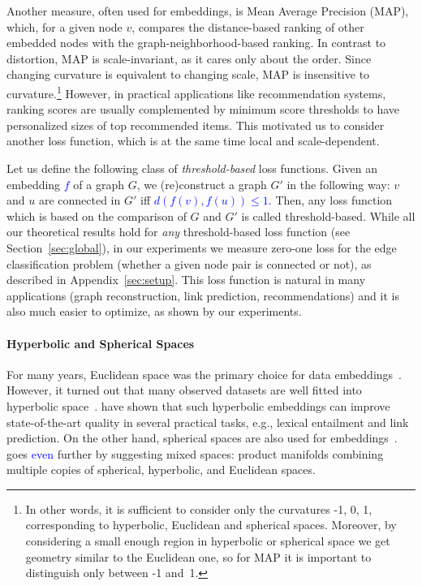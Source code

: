\documentclass{article} %
\newcommand{\ph}[1]{\textcolor{blue}{#1}}
\begin{document}
Another measure, often used for embeddings, is Mean Average Precision (MAP), which, for a given node $v$, compares the distance-based ranking of other embedded nodes with the graph-neighborhood-based ranking. In contrast to distortion, MAP is scale-invariant, as it cares only about the order. Since changing curvature is equivalent to changing scale, MAP is insensitive to curvature.\footnote{In other words, it is sufficient to consider only the curvatures -1, 0, 1, corresponding to hyperbolic, Euclidean and spherical spaces. Moreover, by considering a small enough region in hyperbolic or spherical space we get geometry similar to the Euclidean one, so for MAP it is important to distinguish only between -1 and~1.} 
However, in practical applications like recommendation systems, ranking scores are usually complemented by minimum score thresholds to have personalized sizes of top recommended items.
This motivated us to consider another loss function, which is at the same time local and scale-dependent. 

Let us define the following class of \textit{threshold-based} loss functions. Given an embedding \ph{$f$} of a graph $G$, we (re)construct a graph $G'$ in the following way: $v$ and $u$ are connected in $G'$ iff \ph{$d(f(v),f(u))\le 1$}. Then, any loss function which is based on the comparison of $G$ and $G'$ is called threshold-based. While all our theoretical results hold for \textit{any} threshold-based loss function (see Section~\ref{sec:global}), in our experiments we measure zero-one loss for the edge classification problem (whether a given node pair is connected or not), as described in Appendix~\ref{sec:setup}. This loss function is natural in many applications (graph reconstruction, link prediction, recommendations) and it is also much easier to optimize, as shown by our experiments.

\paragraph{Hyperbolic and Spherical Spaces}

For many years, Euclidean space was the primary choice for data embeddings~\citep{goyal2018graph}. However, it turned out that many observed datasets are well fitted into hyperbolic space~\citep{krioukov2010hyperbolic}. \citet{nickel2017poincare} have shown that such hyperbolic embeddings can improve state-of-the-art quality in several practical tasks, e.g., lexical entailment and link prediction. On the other hand, spherical spaces are also used for embeddings~\citep{liu2017sphereface}. \citet{gu2019learning} goes \ph{even} further by suggesting mixed spaces: product manifolds combining multiple copies of spherical, hyperbolic, and Euclidean spaces. 
\end{document}
